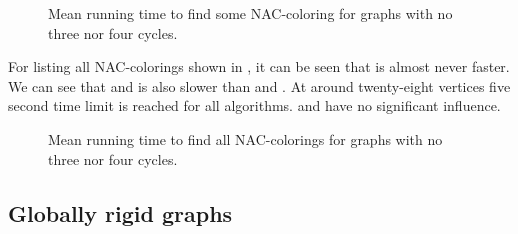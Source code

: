 \begin{figure}[thbp]
	\centering
	\scalebox{\BenchFigureScale}{}
	\caption[Mean runtime for graphs with no 3 nor 4 cycles (some)]{
		Mean running time to find some NAC-coloring for graphs with no three nor four cycles.}%
	\label{fig:graph_count_no_3_nor_4_cycles_first_runtime}
\end{figure}%

For listing all NAC-colorings shown
in ,
it can be seen that \NaiveCycles{} is almost never faster.
We can see that \None{} and \CyclesMatchChunks{} is also slower than
\Neighbors{} and \NeighborsDegree{}.
At around twenty-eight vertices five second time limit is reached for all algorithms.
\MergeLinear{} and \SharedVertices{} have no significant influence.
%
\begin{figure}[thbp]
	\centering
	\scalebox{\BenchFigureScale}{}
	\caption[Mean runtime for graphs with no 3 nor 4 cycles (all)]{
		Mean running time to find all NAC-colorings for graphs with no three nor four cycles.}%
	\label{fig:graph_count_no_3_nor_4_cycles_all_runtime}
\end{figure}%


\subsection*{Globally rigid graphs}

